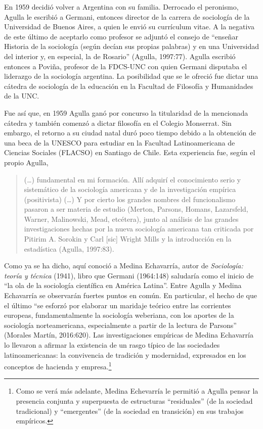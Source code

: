 En 1959 decidió volver a Argentina con su familia. Derrocado el peronismo, Agulla le escribió a Germani, entonces director de la carrera de sociología de la Universidad de Buenos Aires, a quien le envió su currículum vitae. A la negativa de este último de aceptarlo como profesor se adjuntó el consejo de ``enseñar Historia de la sociología (según decían sus propias palabras) y en una Universidad del interior y, en especial, la de Rosario'' (Agulla, 1997:77). Agulla escribió entonces a Poviña, profesor de la FDCS-UNC con quien Germani disputaba el liderazgo de la sociología argentina. La posibilidad que se le ofreció fue dictar una cátedra de sociología de la educación en la Facultad de Filosofía y Humanidades de la UNC.

Fue así que, en 1959 Agulla ganó por concurso la titularidad de la mencionada cátedra y también comenzó a dictar filosofía en el Colegio Monserrat. Sin embargo, el retorno a su ciudad natal duró poco tiempo debido a la obtención de una beca de la UNESCO para estudiar en la Facultad Latinoamericana de Ciencias Sociales (FLACSO) en Santiago de Chile. Esta experiencia fue, según el propio Agulla,

\begin{quote}
(\dots) fundamental en mi formación. Allí adquirí el conocimiento serio y sistemático de la sociología americana y de la investigación empírica (positivista) (\dots) Y por cierto los grandes nombres del funcionalismo pasaron a ser materia de estudio (Merton, Parsons, Homans, Lazarsfeld, Warner, Malinowski, Mead, etcétera), junto al análisis de las grandes investigaciones hechas por la nueva sociología americana tan criticada por Pitirim A. Sorokin y Carl [sic] Wright Mills y la introducción en la estadística (Agulla, 1997:83).
\end{quote}

Como ya se ha dicho, aquí conoció a Medina Echavarría, autor de \emph{Sociología: teoría y técnica} (1941), libro que Germani (1964:148) saludaría como el inicio de ``la ola de la sociología científica en América Latina''. Entre Agulla y Medina Echavarría se observarán fuertes puntos en común. En particular, el hecho de que el último ``se esforzó por elaborar un maridaje teórico entre las corrientes europeas, fundamentalmente la sociología weberiana, con los aportes de la sociología norteamericana, especialmente a partir de la lectura de Parsons'' (Morales Martín, 2016:620). Las investigaciones empíricas de Medina Echavarría lo llevaron a afirmar la existencia de un rasgo típico de las sociedades latinoamericanas: la convivencia de tradición y modernidad, expresados en los conceptos de hacienda y empresa.\footnote{Como se verá más adelante, Medina Echevarría le permitió a Agulla pensar la presencia conjunta y superpuesta de estructuras ``residuales'' (de la sociedad tradicional) y ``emergentes'' (de la sociedad en transición) en sus trabajos empíricos.}

